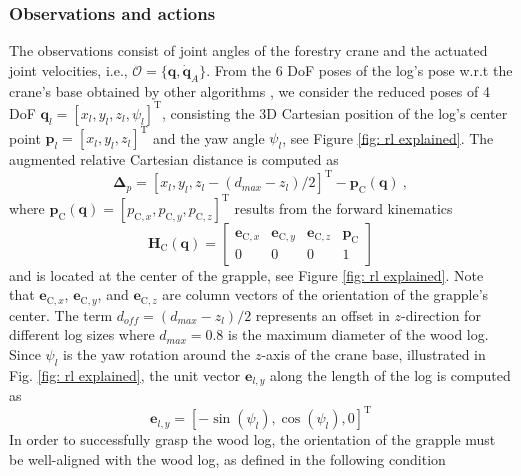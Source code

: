 \subsubsection{Observations and actions} 
\label{sec: observation}
The observations consist of joint angles of the forestry crane and the actuated joint velocities, i.e., $\mathcal{O} = \{\mathbf{q},\dot{\mathbf{q}}_{A}\}$.  
From the 6 DoF poses of the log's pose w.r.t the crane's base obtained by other algorithms \cite{wen2023bundlesdf,vuong2023grasp}, we consider the reduced poses of 4 DoF $\mathbf{q}_l = [x_{l},y_{l}, z_{l}, \psi_l]^\mathrm{T}$, consisting the 3D Cartesian position of the log's center point $\mathbf{p}_l = [x_{l},y_{l}, z_{l}]^\mathrm{T}$ and the yaw angle $\psi_l$, see Figure \ref{fig: rl explained}. The augmented relative Cartesian distance is computed as
\begin{equation}
    \bm{\Delta}_p =  [x_{l},y_{l}, z_{l} - (d_{max}-z_l)/2]^\mathrm{T} - \mathbf{p}_\mathrm{C}(\mathbf{q}) \:,
    \label{eq: relative distance}
\end{equation}
where $\mathbf{p}_\mathrm{C}(\mathbf{q}) = [p_{\mathrm{C},x},p_{\mathrm{C},y},p_{\mathrm{C},z}]^\mathrm{T}$ results from the forward kinematics
\begin{equation}
    \mathbf{H}_\mathrm{C}(\mathbf{q}) = 
    \begin{bmatrix}
        \mathbf{e}_{\mathrm{C},x} & \mathbf{e}_{\mathrm{C},y} & \mathbf{e}_{\mathrm{C},z} & \mathbf{p}_\mathrm{C} \\
        0 & 0 & 0 & 1
    \end{bmatrix}
\end{equation}
and is located at the center of the grapple, see Figure \ref{fig: rl explained}. Note that $\mathbf{e}_{\mathrm{C},x}$, $\mathbf{e}_{\mathrm{C},y}$, and $\mathbf{e}_{\mathrm{C},z}$ are column vectors of the orientation of the grapple's center. The term $d_{off} = (d_{max}-z_l)/2$ represents an offset in $z$-direction for different log sizes where $d_{max} = 0.8$ is the maximum diameter of the wood log. 
Since $\psi_l$ is the yaw rotation around the $z$-axis of the crane base, illustrated in Fig. \ref{fig: rl explained}, the unit vector $\mathbf{e}_{l,y}$ along the length of the log is computed as
\begin{equation}
    \mathbf{e}_{l,y} = [-\sin(\psi_l), \cos(\psi_l), 0]^\mathrm{T}
\end{equation}
In order to successfully grasp the wood log, the orientation of the grapple must be well-aligned with the wood log, as defined in the following condition
